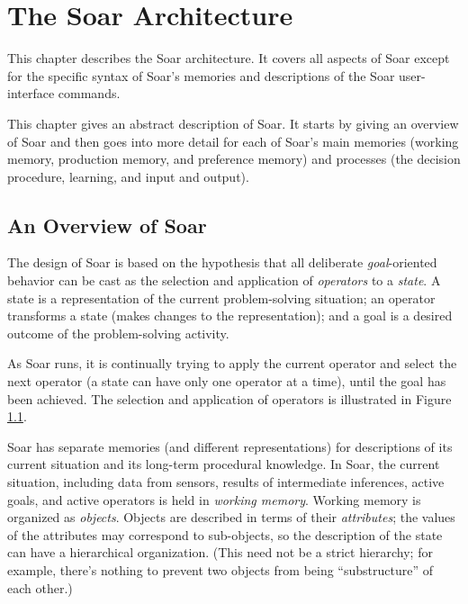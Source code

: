 \chapter{The Soar Architecture}
\label{ARCH}

This chapter describes the Soar architecture.  It covers all aspects of Soar
except for the specific syntax of Soar's memories and descriptions of the
Soar user-interface commands.

This chapter gives an abstract description of Soar.  It starts by giving
an overview of Soar and then goes into more detail for each of Soar's
main memories (working memory, production memory, and preference memory)
and processes (the decision procedure, learning, and input and output).

\section{An Overview of Soar}
\label{ARCH-overview}

The design of Soar is based on the hypothesis that all deliberate
\textit{goal}-oriented behavior can be cast as the selection and application
of \textit{operators} to a \textit{state}. A state is a representation of the
current problem-solving situation; an operator transforms a state (makes
changes to the representation); and a goal is a desired outcome of the
problem-solving activity.

As Soar runs, it is continually trying to apply the current operator and
select the next operator (a state can have only one operator at a time),
until the goal has been achieved. The selection and application of
operators is illustrated in Figure \ref{fig:select-apply}. 

\begin{figure}
\label{fig:select-apply}
\end{figure}

Soar has separate memories (and different representations) for
descriptions of its current situation and its long-term procedural knowledge.  In
Soar, the current situation, including data from sensors, results of
intermediate inferences, active goals, and active operators is held in
\emph{working memory}.  Working memory is organized as
\emph{objects}. Objects are described in terms of their
\emph{attributes}; the values of the attributes may correspond to
sub-objects, so the description of the state can have a hierarchical
organization. (This need not be a strict hierarchy; for example, there's
nothing to prevent two objects from being ``substructure'' of each
other.)

